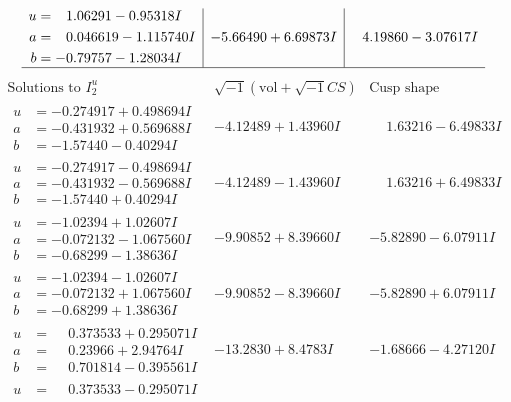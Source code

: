 \documentclass[1p]{elsarticle_modified}
\theoremstyle{definition}
\newcommand{\I}{\sqrt{-1}}
\begin{document}
$$\begin{array}{c|c|c}
\begin{aligned}
u &= \phantom{-}1.06291 - 0.95318 I \\
a &= \phantom{-}0.046619 - 1.115740 I \\
b &= -0.79757 - 1.28034 I\end{aligned}
 & -5.66490 + 6.69873 I & \phantom{-}4.19860 - 3.07617 I\\
 \hline 
 \end{array}$$\newpage$$\begin{array}{c|c|c}  
\text{Solutions to }I^u_{2}& \I (\text{vol} + \sqrt{-1}CS) & \text{Cusp shape}\\
 \hline 
\begin{aligned}
u &= -0.274917 + 0.498694 I \\
a &= -0.431932 + 0.569688 I \\
b &= -1.57440 - 0.40294 I\end{aligned}
 & -4.12489 + 1.43960 I & \phantom{-}1.63216 - 6.49833 I \\ \hline\begin{aligned}
u &= -0.274917 - 0.498694 I \\
a &= -0.431932 - 0.569688 I \\
b &= -1.57440 + 0.40294 I\end{aligned}
 & -4.12489 - 1.43960 I & \phantom{-}1.63216 + 6.49833 I \\ \hline\begin{aligned}
u &= -1.02394 + 1.02607 I \\
a &= -0.072132 - 1.067560 I \\
b &= -0.68299 - 1.38636 I\end{aligned}
 & -9.90852 + 8.39660 I & -5.82890 - 6.07911 I \\ \hline\begin{aligned}
u &= -1.02394 - 1.02607 I \\
a &= -0.072132 + 1.067560 I \\
b &= -0.68299 + 1.38636 I\end{aligned}
 & -9.90852 - 8.39660 I & -5.82890 + 6.07911 I \\ \hline\begin{aligned}
u &= \phantom{-}0.373533 + 0.295071 I \\
a &= \phantom{-}0.23966 + 2.94764 I \\
b &= \phantom{-}0.701814 - 0.395561 I\end{aligned}
 & -13.2830 + 8.4783 I & -1.68666 - 4.27120 I \\ \hline\begin{aligned}
u &= \phantom{-}0.373533 - 0.295071 I \\

\end{aligned}
\end{array}$$
\end{document}
